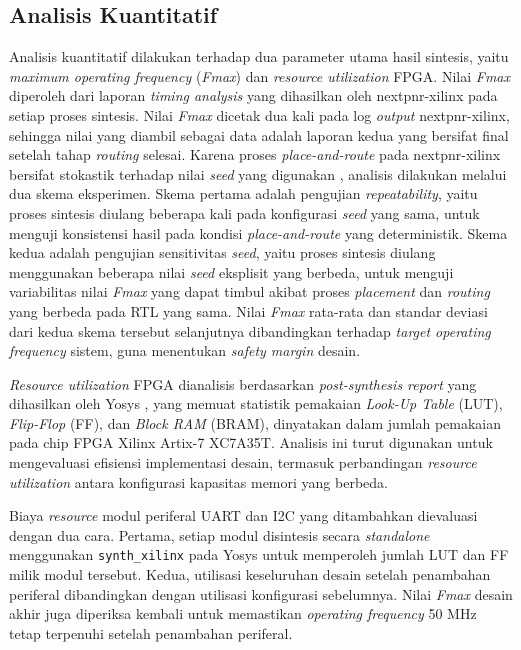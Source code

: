 \subsection{Analisis Kuantitatif}
\label{subsec:analisis-kuantitatif}

Analisis kuantitatif dilakukan terhadap dua parameter utama hasil sintesis, yaitu \textit{maximum operating frequency} (\textit{Fmax}) dan \textit{resource utilization} FPGA. Nilai \textit{Fmax} diperoleh dari laporan \textit{timing analysis} yang dihasilkan oleh nextpnr-xilinx pada setiap proses sintesis. Nilai \textit{Fmax} dicetak dua kali pada log \textit{output} nextpnr-xilinx, sehingga nilai yang diambil sebagai data adalah laporan kedua yang bersifat final setelah tahap \textit{routing} selesai. Karena proses \textit{place-and-route} pada nextpnr-xilinx bersifat stokastik terhadap nilai \textit{seed} yang digunakan \cite{darvishi2025pipeline}, analisis dilakukan melalui dua skema eksperimen. Skema pertama adalah pengujian \textit{repeatability}, yaitu proses sintesis diulang beberapa kali pada konfigurasi \textit{seed} yang sama, untuk menguji konsistensi hasil pada kondisi \textit{place-and-route} yang deterministik. Skema kedua adalah pengujian sensitivitas \textit{seed}, yaitu proses sintesis diulang menggunakan beberapa nilai \textit{seed} eksplisit yang berbeda, untuk menguji variabilitas nilai \textit{Fmax} yang dapat timbul akibat proses \textit{placement} dan \textit{routing} yang berbeda pada RTL yang sama. Nilai \textit{Fmax} rata-rata dan standar deviasi dari kedua skema tersebut selanjutnya dibandingkan terhadap \textit{target operating frequency} sistem, guna menentukan \textit{safety margin} desain.

\textit{Resource utilization} FPGA dianalisis berdasarkan \textit{post-synthesis report} yang dihasilkan oleh Yosys \cite{shah2019yosys}, yang memuat statistik pemakaian \textit{Look-Up Table} (LUT), \textit{Flip-Flop} (FF), dan \textit{Block RAM} (BRAM), dinyatakan dalam jumlah pemakaian pada chip FPGA Xilinx Artix-7 XC7A35T. Analisis ini turut digunakan untuk mengevaluasi efisiensi implementasi desain, termasuk perbandingan \textit{resource utilization} antara konfigurasi kapasitas memori yang berbeda.

Biaya \textit{resource} modul periferal UART dan I2C yang ditambahkan dievaluasi dengan dua cara. Pertama, setiap modul disintesis secara \textit{standalone} menggunakan \texttt{synth\_xilinx} pada Yosys untuk memperoleh jumlah LUT dan FF milik modul tersebut. Kedua, utilisasi keseluruhan desain setelah penambahan periferal dibandingkan dengan utilisasi konfigurasi sebelumnya. Nilai \textit{Fmax} desain akhir juga diperiksa kembali untuk memastikan \textit{operating frequency} 50 MHz tetap terpenuhi setelah penambahan periferal.


